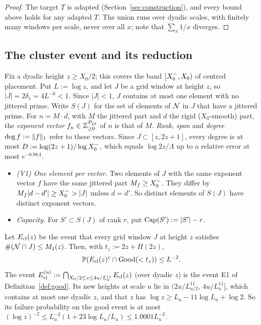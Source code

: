 \begin{proof}
The target $T$ is adapted (Section~\ref{sec:construction}), and every bound above holds for any adapted $T$. The union runs over
dyadic scales, with finitely many windows per scale, never over all $x$; note that $\sum_x1/x$ diverges.
\end{proof}

\subsection{The cluster event and its reduction}\label{sec:queue-ecl}

Fix a dyadic height $z\ge X_0/2$; this covers the band $[X_0^{-},X_0)$ of centred placement. Put $L:=\log z$, and let $J$ be a grid
window at height $z$, so $|J|=2\delta_1=4L^{-6}<1$. Since $|J|<1$, $J$ contains at most one element with no jittered prime.
Write $S(J)$ for the set of elements of $\mathcal{N}$ in $J$ that have a jittered prime. For $n=M\cdot d$, with $M$ the jittered part
and $d$ the rigid ($X_0$-smooth) part, the \emph{exponent vector} $f_n\in\mathbb{Z}_{\ge0}^{\mathcal P_{\mathrm{jit}}}$ of $n$ is
that of $M$. \emph{Rank}, \emph{span} and \emph{degree} $\operatorname{deg} f:=\|f\|_1$ refer to these vectors.
Since $J\subset[z,2z+1]$, every degree is at most $D:=\log(2z+1)/\log X_0^{-}$, which equals $\log2z/\Lambda$ up to a relative
error at most $e^{-0.98\Lambda}$.
\begin{itemize}
\item \emph{(V1) One element per vector.} Two elements of $J$ with the same exponent vector $f$ have the same jittered part
  $M_f\ge X_0^{-}$. They differ by $M_f|d-d'|\ge X_0^{-}>|J|$ unless $d=d'$. So distinct elements of $S(J)$ have distinct exponent
  vectors.
\item \emph{Capacity.} For $S'\subset S(J)$ of rank $r$, put $\operatorname{Cap}(S'):=|S'|-r$.
\end{itemize}

\begin{proposition}\label{prop:ecl}
Let $E_{\mathrm{cl}}(z)$ be the event that every grid window $J$ at height $z$ satisfies $\#(\mathcal{N}\cap J)\le M_1(z)$. Then, with
$t_z:=2z+H(2z)$,
\[
\mathbb{P}(E_{\mathrm{cl}}(z)^c\cap\mathrm{Good}(<t_z))\le L^{-2}.
\]
The event $E_{\mathrm{cl}}^{(u)}:=\bigcap_{X_0/2\le z\le4u/L_u^{11}}E_{\mathrm{cl}}(z)$ (over dyadic $z$) is the event E1 of Definition~\ref{def:good}. Its
new heights at scale $u$ lie in $(2u/L_{u/2}^{11},\,4u/L_u^{11}]$, which contains at most one dyadic $z$, and that $z$ has
$\log z\ge L_u-11\log L_u+\log2$. So its failure probability on the good event is at most
$(\log z)^{-2}\le L_u^{-2}(1+23\log L_u/L_u)\le1.0001L_u^{-2}$.
\end{proposition}

